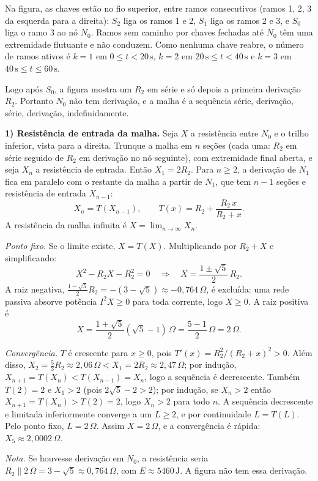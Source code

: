 \documentclass{article}%
\begin{document}
Na figura, as chaves estão no fio superior, entre ramos consecutivos (ramos 1, 2, 3 da esquerda para a direita): $S_2$ liga os ramos 1 e 2, $S_1$ liga os ramos 2 e 3, e $S_0$ liga o ramo 3 ao nó $N_0$. Ramos sem caminho por chaves fechadas até $N_0$ têm uma extremidade flutuante e não conduzem. Como nenhuma chave reabre, o número de ramos ativos é $k=1$ em $0\le t<20\,\text{s}$, $k=2$ em $20\,\text{s}\le t<40\,\text{s}$ e $k=3$ em $40\,\text{s}\le t\le 60\,\text{s}$.

Logo após $S_0$, a figura mostra um $R_2$ em série e só depois a primeira derivação $R_2$. Portanto $N_0$ não tem derivação, e a malha é a sequência série, derivação, série, derivação, indefinidamente.

\textbf{1) Resistência de entrada da malha.} Seja $X$ a resistência entre $N_0$ e o trilho inferior, vista para a direita. Trunque a malha em $n$ seções (cada uma: $R_2$ em série seguido de $R_2$ em derivação no nó seguinte), com extremidade final aberta, e seja $X_n$ a resistência de entrada. Então $X_1=2R_2$. Para $n\ge 2$, a derivação de $N_1$ fica em paralelo com o restante da malha a partir de $N_1$, que tem $n-1$ seções e resistência de entrada $X_{n-1}$:
\[
X_n = T(X_{n-1}), \qquad T(x)=R_2+\frac{R_2\,x}{R_2+x}.
\]
A resistência da malha infinita é $X=\lim_{n\to\infty}X_n$.

\textit{Ponto fixo.} Se o limite existe, $X=T(X)$. Multiplicando por $R_2+X$ e simplificando:
\[
X^2-R_2X-R_2^2=0 \quad\Rightarrow\quad X=\frac{1\pm\sqrt{5}}{2}\,R_2 .
\]
A raiz negativa, $\frac{1-\sqrt{5}}{2}R_2=-(3-\sqrt{5})\approx -0{,}764\,\Omega$, é excluída: uma rede passiva absorve potência $I^2X\ge 0$ para toda corrente, logo $X\ge 0$. A raiz positiva é
\[
X=\frac{1+\sqrt{5}}{2}(\sqrt{5}-1)\,\Omega=\frac{5-1}{2}\,\Omega=2\,\Omega .
\]

\textit{Convergência.} $T$ é crescente para $x\ge 0$, pois $T'(x)=R_2^2/(R_2+x)^2>0$. Além disso, $X_2=\frac{5}{3}R_2\approx 2{,}06\,\Omega<X_1=2R_2\approx 2{,}47\,\Omega$; por indução, $X_{n+1}=T(X_n)<T(X_{n-1})=X_n$, logo a sequência é decrescente. Também $T(2)=2$ e $X_1>2$ (pois $2\sqrt{5}-2>2$); por indução, se $X_n>2$ então $X_{n+1}=T(X_n)>T(2)=2$, logo $X_n>2$ para todo $n$. A sequência decrescente e limitada inferiormente converge a um $L\ge 2$, e por continuidade $L=T(L)$. Pelo ponto fixo, $L=2\,\Omega$. Assim $X=2\,\Omega$, e a convergência é rápida: $X_5\approx 2{,}0002\,\Omega$.

\textit{Nota.} Se houvesse derivação em $N_0$, a resistência seria $R_2\parallel 2\,\Omega=3-\sqrt{5}\approx 0{,}764\,\Omega$, com $E\approx 5460\,\text{J}$. A figura não tem essa derivação.
\end{document}
